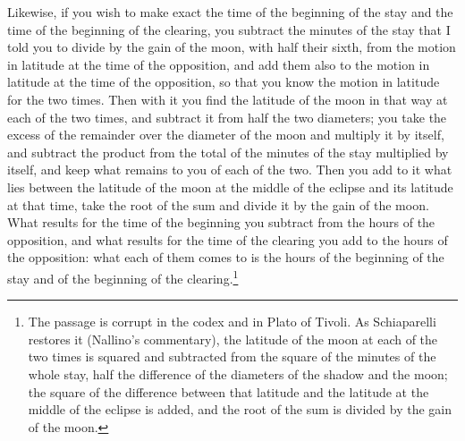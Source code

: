 \documentclass[11pt]{article}
\newcommand{\ArPage}[1]{\marginpar{\footnotesize\color{gray}Ar.\,p.\,#1}}
\begin{document}
\par \ArPage{149}Likewise, if you wish to make exact the time of the beginning of the stay and the time of the beginning of the clearing, you subtract the minutes of the stay that I told you to divide by the gain of the moon, with half their sixth, from the motion in latitude at the time of the opposition, and add them also to the motion in latitude at the time of the opposition, so that you know the motion in latitude for the two times. Then with it you find the latitude of the moon in that way at each of the two times, and subtract it from half the two diameters; you take the excess of the remainder over the diameter of the moon and multiply it by itself, and subtract the product from the total of the minutes of the stay multiplied by itself, and keep what remains to you of each of the two. Then you add to it what lies between the latitude of the moon at the middle of the eclipse and its latitude at that time, take the root of the sum and divide it by the gain of the moon. What results for the time of the beginning you subtract from the hours of the opposition, and what results for the time of the clearing you add to the hours of the opposition: what each of them comes to is the hours of the beginning of the stay and of the beginning of the clearing.\footnote{The passage is corrupt in the codex and in Plato of Tivoli. As Schiaparelli restores it (Nallino's commentary), the latitude of the moon at each of the two times is squared and subtracted from the square of the minutes of the whole stay, half the difference of the diameters of the shadow and the moon; the square of the difference between that latitude and the latitude at the middle of the eclipse is added, and the root of the sum is divided by the gain of the moon.}\par
\end{document}
